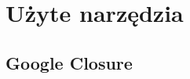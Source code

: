 \chapter{Użyte narzędzia}
\label{cha:uzyteNarzedzia}

\section{Google Closure}
\label{sec:googleClosure}

